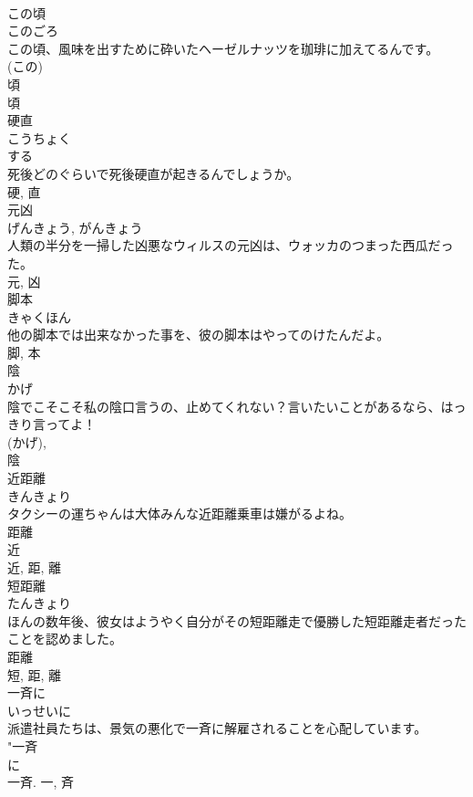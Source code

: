 \documentclass[8pt]{extreport}
\begin{document}
\begin{CJK}{UTF8}{min}
\\	この頃	
\\	このごろ	
\\	この頃、風味を出すために砕いたヘーゼルナッツを珈琲に加えてるんです。	
\\	(この) 
\\	頃 
\\	頃	
\\	硬直	
\\	こうちょく	
\\	する 
\\	死後どのぐらいで死後硬直が起きるんでしょうか。	
\\	硬, 直	
\\	元凶	
\\	げんきょう, がんきょう	
\\	人類の半分を一掃した凶悪なウィルスの元凶は、ウォッカのつまった西瓜だった。	
\\	元, 凶	
\\	脚本	
\\	きゃくほん	
\\	他の脚本では出来なかった事を、彼の脚本はやってのけたんだよ。	
\\	脚, 本	
\\	陰	
\\	かげ	
\\	陰でこそこそ私の陰口言うの、止めてくれない？言いたいことがあるなら、はっきり言ってよ！	
\\	(かげ), 
\\	陰	
\\	近距離	
\\	きんきょり	
\\	タクシーの運ちゃんは大体みんな近距離乗車は嫌がるよね。	
\\	距離 
\\	近 
\\	近, 距, 離	
\\	短距離	
\\	たんきょり	
\\	ほんの数年後、彼女はようやく自分がその短距離走で優勝した短距離走者だったことを認めました。	
\\	距離 
\\	短, 距, 離	
\\	一斉に	
\\	いっせいに	
\\	派遣社員たちは、景気の悪化で一斉に解雇されることを心配しています。	
\\	"一斉 
\\	に 
\\	一斉.	一, 斉	

\end{CJK}
\end{document}
